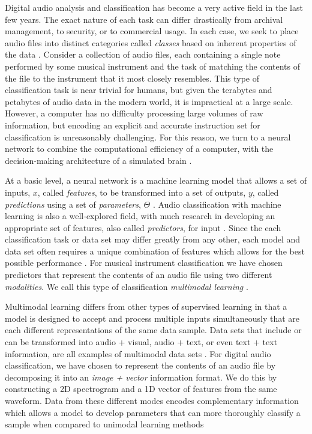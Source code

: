\documentclass[conference,onecolumn,letterpaper]{IEEEtran}
\begin{document}
Digital audio analysis and classification has become a very active field in the last few years. The exact nature of each task can differ drastically from archival management, to security, or to commercial usage. In each case, we seek to place audio files into distinct categories called \textit{classes} based on inherent properties of the data \cite{James,Khan,Liu}. Consider a collection of audio files, each containing a single note performed by some musical instrument and the task of matching the contents of the file to the instrument that it most closely resembles. This type of classification task is near trivial for humans, but given the terabytes and petabytes of audio data in the modern world, it is impractical at a large scale. However, a computer has no difficulty processing large volumes of raw information, but encoding an explicit and accurate instruction set for classification is unreasonably challenging. For this reason, we turn to a neural network to combine the computational efficiency of a computer, with the decision-making architecture of a simulated brain \cite{Geron}. 

At a basic level, a neural network is a machine learning model that allows a set of inputs, $x$, called \textit{features}, to be transformed into a set of outputs, $y$,  called \textit{predictions} using a set of \textit{parameters}, $\Theta$ \cite{Geron,Goodfellow,Virtanen}. Audio classification with machine learning is also a well-explored field, with much research in developing an appropriate set of features, also called \textit{predictors}, for input \cite{James,Liu,Mierswa,Zhang}. Since the each classification task or data set may differ greatly from any other, each model and data set often requires a unique combination of features which allows for the best possible performance \cite{Virtanen}. For musical instrument classification we have chosen predictors that represent the contents of an audio file using two different \textit{modalities}. We call this type of classification \textit{multimodal learning} \cite{Ngiam}.

Multimodal learning differs from other types of supervised learning in that a model is designed to accept and process multiple inputs simultaneously that are each different representations of the same data sample. Data sets that include or can be transformed into audio + visual, audio + text, or even text + text information, are all examples of multimodal data sets \cite{Li}. For digital audio classification, we have chosen to represent the contents of an audio file by decomposing it into an \textit{image + vector} information format. We do this by constructing a 2D spectrogram and a 1D vector of features from the same waveform. Data from these different modes encodes complementary information which allows a model to develop parameters that can more thoroughly classify a sample when compared to unimodal learning methods \cite{Li}
\end{document}
